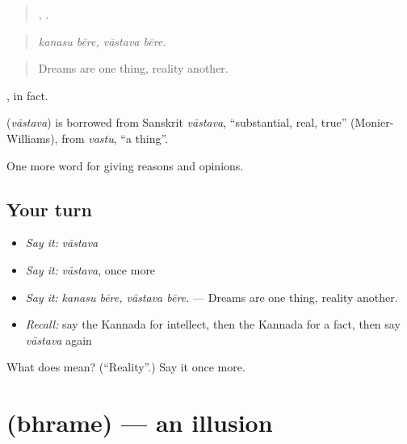 \begin{quote}
 ,  .
\end{quote}

\begin{quote}
\emph{kanasu bēre, vāstava bēre.}
\end{quote}

\begin{quote}
Dreams are one thing, reality another.
\end{quote}

, in fact.

\begin{cousinweb}
\textbf{} (\emph{vāstava}) is borrowed from Sanskrit \emph{vāstava}, \textquotedblleft{}substantial, real, true\textquotedblright{} (Monier-Williams), from \emph{vastu}, \textquotedblleft{}a thing\textquotedblright{}.
\end{cousinweb}

\begin{grammarlens}[title={What you've built}]
One more word for giving reasons and opinions.
\end{grammarlens}

\subsection*{Your turn}
\begin{itemize}
\raggedright
  \item \emph{Say it:} \emph{vāstava}
  \item \emph{Say it:} \emph{vāstava}, once more
  \item \emph{Say it:} \emph{kanasu bēre, vāstava bēre.} — Dreams are one thing, reality another.
  \item \emph{Recall:} say the Kannada for intellect, then the Kannada for a fact, then say \emph{vāstava} again
\end{itemize}

\begin{tcolorbox}[breakable,colback=teal!4,colframe=teal!35!black,title={Before you move on}]
What does  mean? (\textquotedblleft{}Reality\textquotedblright{}.) Say it once more.
\end{tcolorbox}
\section[\texorpdfstring{\kn{ಭ್ರಮೆ} (bhrame)}{ಭ್ರಮೆ (bhrame)}]{ (bhrame) — an illusion}

